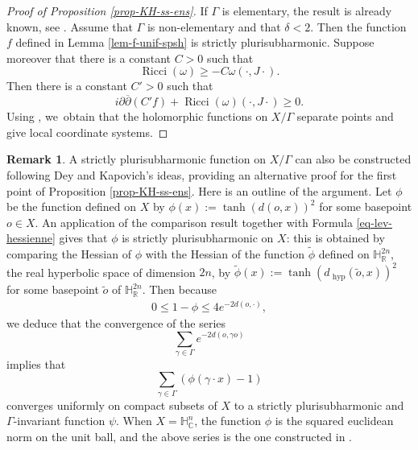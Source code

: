 \documentclass[11pt]{article}
\theoremstyle{definition}
\newtheorem*{remark}{Remark}
\newcommand{\C}{\mathbb{C}}
\newcommand{\R}{\mathbb{R}}
\newcommand{\HNC}{\mathbb{H}^{n}_{\C}}
\DeclareMathOperator{\Ricci}{Ricci}
\def\C{\mathbb{C}}
\newcommand{\HNC}{\mathbb{H}^{n}_{\C}}
\begin{document}
\begin{proof}[Proof of Proposition \ref{prop-KH-ss-ens}]
If $\Gamma$ is elementary, the result is already known, see \cite[Th.\,1.1 and Proposition 1.3]{chenDiscreteGroupsHolomorphic2013}. Assume that $\Gamma$ is non-elementary and that $\delta<2$. Then the function $f$ defined in Lemma \ref{lem-f-unif-spsh} is strictly plurisubharmonic. Suppose moreover that there is a constant $C>0$ such that
\begin{equation*}
\Ricci(\omega)\ge -C\omega(\cdot,J\cdot).
\end{equation*}
Then there is a constant $C'>0$ such that
\begin{equation*}
i\partial\overline{\partial}(C'f) + \Ricci(\omega)(\cdot,J\cdot) \ge 0.
\end{equation*}
Using \cite[Prop.\,4.1]{chenDiscreteGroupsHolomorphic2013}, we~obtain that the holomorphic functions on $X/\Gamma$ separate points and give local coordinate systems.
\end{proof}

\begin{remark}A strictly plurisubharmonic function on $X/\Gamma$ can also be constructed following Dey and Kapovich's ideas, providing an alternative proof for the first point of Proposition \ref{prop-KH-ss-ens}. Here is an outline of the argument. Let $\phi$ be the function defined on $X$ by $\phi(x):=\tanh(d(o,x))^{2}$ for some basepoint $o\in X$. An application of the comparison result \cite[Th.\,A]{greeneFunctionTheoryManifolds1979} together with Formula \eqref{eq-lev-hessienne} gives that $\phi$ is strictly plurisubharmonic on $X$: this is obtained by comparing the Hessian of $\phi$ with the Hessian of the function $\widetilde{\phi}$ defined on $\mathbb{H}^{2n}_{\R}$, the real hyperbolic space of dimension $2n$, by $\widetilde{\phi}(x):= \tanh(d_{\text{ hyp}}(\widetilde{o},x))^{2}$ for some basepoint $\widetilde{o}$ of $\mathbb{H}^{2n}_{\R}$. Then because
\begin{align*}
0\leq 1-\phi \leq 4e^{-2d(o,\cdot)},
\end{align*}
we deduce that the convergence of the series
\begin{equation*}
\sum_{\gamma \in \Gamma}e^{-2d(o,\gamma o)}
\end{equation*} implies that
\begin{equation*}
\sum_{\gamma \in \Gamma}(\phi(\gamma\cdot x)-1)
\end{equation*} converges uniformly on compact subsets of $X$ to a strictly plurisubharmonic and $\Gamma$\nobreakdash-invariant function $\psi$. When $X=\HNC$, the function $\phi$ is the squared euclidean norm on the unit ball, and the above series is the one constructed in \cite{deyNoteComplexhyperbolicKleinian2020}.
\end{remark}
\end{document}
